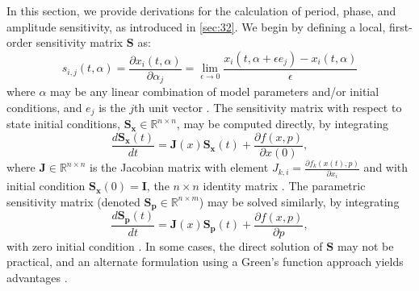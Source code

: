 In this section, we provide derivations for the calculation of period, phase, and amplitude sensitivity, as introduced in \ref{sec:32}.
We begin by defining a local, first-order sensitivity matrix $\mathbf{S}$ as:
\begin{equation}
    s_{i,j}(t,\alpha) = \frac{\partial x_i(t,\alpha)}{\partial \alpha_j} = \lim_{\epsilon\to 0}\frac{x_i(t, \alpha+\epsilon e_j) -x_i(t, \alpha)}{\epsilon}
\end{equation}
where $\alpha$ may be any linear combination of model parameters and/or initial conditions, and $e_j$ is the $j$th unit vector \cite{Tidor2009,Taylor2008a}.
The sensitivity matrix with respect to state initial conditions, $\mathbf{S_x}\in\mathbb{R}^{n\times n}$, may be computed directly, by integrating
\begin{equation}
    \label{eq:sx}
    \frac{d\mathbf{S_x}(t)}{dt} = \mathbf{J}(x)\mathbf{S_x}(t) + \frac{\partial f(x,p)}{\partial x(0)},
\end{equation}
where $\mathbf{J}\in\mathbb{R}^{n\times n}$ is the Jacobian matrix with element $J_{k,i} = \frac{\partial f_k(x(t),p)}{\partial x_i}$ and with initial condition $\mathbf{S_x}(0)=\mathbf{I}$, the $n\times n$ identity matrix \cite{Rabitz1983}.
The parametric sensitivity matrix (denoted $\mathbf{S_p}\in\mathbb{R}^{n\times m}$) may be solved similarly, by integrating
\begin{equation}
    \label{eq:sp}
    \frac{d\mathbf{S_p}(t)}{dt} = \mathbf{J}(x)\mathbf{S_p}(t) + \frac{\partial f(x,p)}{\partial p},
\end{equation}
with zero initial condition \cite{Rabitz1983, Tidor2009}.
In some cases, the direct solution of $\mathbf{S}$ may not be practical, and an alternate formulation using a Green's function approach yields advantages \cite{Rabitz1983}.



